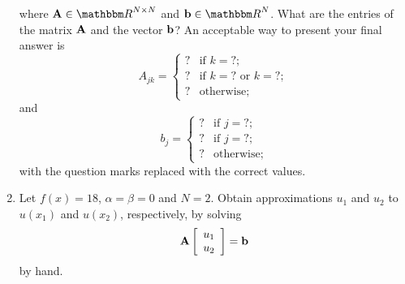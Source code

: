 \begin{enumerate}
\[\]
where $\BA\in\R^{N\times N}$ and $\Bb\in\R^N$. What are the entries of the matrix ${\bf A}$ and the vector ${\bf b}$? An acceptable way to present your final answer is
\[
A_{jk}=\left\{\begin{array}{rl}
? & \mbox{if }k=?;
\\
? & \mbox{if }k=?\mbox{ or }k=?;
\\
? & \mbox{otherwise};
\end{array}\right.
\]
and
\[
b_j=\left\{\begin{array}{rl}
? & \mbox{if }j=?;
\\
? & \mbox{if }j=?;
\\
? & \mbox{otherwise};
\end{array}\right.
\]
with the question marks replaced with the correct values.
\\
\item Let $f(x)=18$, $\alpha=\beta=0$ and $N=2$. Obtain approximations $u_1$ and $u_2$ to $u(x_1)$ and $u(x_2)$, respectively, by solving
\[
{\bf A}\left[\begin{array}{c} u_1 \\u_2 \end{array}\right]={\bf b}
\]
by hand.
\end{enumerate} 




